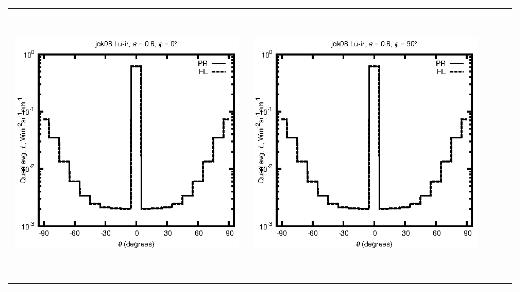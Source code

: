 \documentclass[10pt,a4paper]{article}
\begin{document}
\begin{adjustwidth}{-1.2in}{-1.2in}
\begin{tabular}{c c c c}
\includegraphics[height=7cm]{../eps/jok06_Lu_ir_fwd.eps} &
\includegraphics[height=7cm]{../eps/jok06_Lu_ir_cross.eps} \\
\end{tabular}

\pagebreak


\end{adjustwidth}
\end{document}
